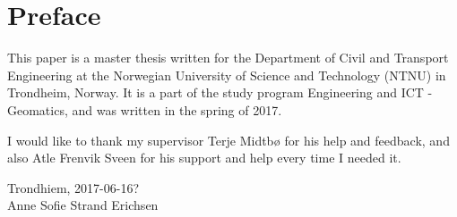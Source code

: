 \chapter*{Preface}
%

This paper is a master thesis written for the Department of Civil and Transport Engineering at the Norwegian University of Science and Technology (NTNU) in Trondheim, Norway. It is a part of the study program Engineering and ICT - Geomatics, and was written in the spring of 2017. 

I would like to thank my supervisor Terje Midtbø for his help and feedback, and also Atle Frenvik Sveen for his support and help every time I needed it. \newline

\begin{center}
	
	Trondhiem, 2017-06-16?\\
	Anne Sofie Strand Erichsen
	
\end{center}